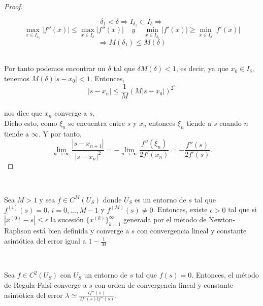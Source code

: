 \begin{proof}
\begin{itemize}
		\[
			\delta_1 < \delta \Rightarrow I_{\delta_1} \subset I_{\delta} \Rightarrow
		\]
		\[
			\max_{x \in I_{\delta_1}} |f''(x)| \leq \max_{x \in I_{\delta}} |f''(x)| \;\;\;\; y \;\;\;\; \min_{x \in I_{\delta_1}}|f'(x)| \geq \min_{x \in I_{\delta}}|f'(x)|
		\]
		\[
			\Rightarrow M(\delta_1) \leq M(\delta)
		\]
	\end{itemize}
	${ }$\\
	
	Por tanto podemos encontrar un $\delta$ tal que $\delta M(\delta) < 1$, es decir, ya que $x_0 \in I_{\delta}$, tenemos $M(\delta)|s - x_0| < 1$. Entonces,
	${ }$\\
	\[
		|s - x_n| \leq \frac{1}{M} (M |s - x_0|)^{2^n}
	\]
	${ }$\\
	nos dice que $x_n$ converge a $s$.
	${ }$\\
	
	Dicho esto, como $\xi_n$ se encuentra entre $s$ y $x_n$ entonces $\xi_n$ tiende a $s$ cuando $n$ tiende a $\infty$. Y por tanto,
	${ }$\\
	\[
		\lim_{n \rightarrow \infty} \frac{|s - x_{n+1}|}{|s - x_{n}|^2} = - \lim_{n \rightarrow \infty} \frac{f''(\xi_n)}{2f'(x_n)} = - \frac{f''(s)}{2f'(s)}.
	\]
\end{proof}
${ }$\\

\begin{teorema}
	Sea $M > 1$ y sea $f \in C^M(U_S)$ donde $U_S$ es un entorno de $s$ tal que $f^{(i)}(s) = 0$, $i = 0, ..., M-1$ y $f^{(M)}(s)\neq 0$. Entonces, existe $\epsilon > 0$ tal que si $|x^{(0)} -s| \leq \epsilon$ la sucesión $\{x^{(k)}\}^{\infty}_{k=1}$ generada por el método de Newton-Raphson está bien definida y converge a $s$ con convergencia lineal y constante asintótica del error igual a $1 - \frac{1}{M}$
\end{teorema}
${ }$\\


\begin{teorema}
	Sea $f \in C^2(U_S)$ con $U_S$ un entorno de $s$ tal que $f(s) = 0$. Entonces, el método de Regula-Falsi converge a $s$ con orden de convergencia lineal y constante asintótica del error $\lambda \simeq \frac{l f''(s)}{2 f'(s) l f''(s)}$.
	
\end{teorema}

